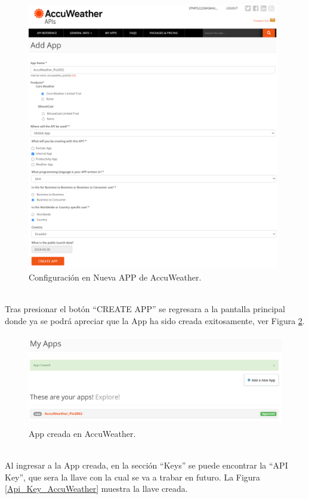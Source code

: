 \documentclass[a4paper,10pt, oneside, titlepage]{article}
\begin{document}
	\begin{figure}[!h]
		\centering
		\includegraphics[width = 1\linewidth, height = 11.7cm]{Configuracion_Nueva_APP_AccuWeather.png}
		\caption{Configuración  en Nueva APP de AccuWeather.}
		\label{Configuracion_Nueva_APP_AccuWeather}
	\end{figure} \\
	\indent Tras presionar el botón ``CREATE APP'' se regresara a la pantalla principal donde ya se podrá apreciar que la App ha sido creada exitosamente, ver Figura \ref{Nueva_APP_AccuWeather_Exito}.
	\begin{figure}[!h]
		\centering
		\includegraphics[width = 1\linewidth, height = 4cm]{Nueva_APP_AccuWeather_Exito.png}
		\caption{App creada en AccuWeather.}
		\label{Nueva_APP_AccuWeather_Exito}
	\end{figure} \\
	\indent Al ingresar a la App creada, en la sección ``Keys'' se puede encontrar la ``API Key'', que sera la llave con la cual se va a trabar en futuro. La Figura \ref{Api_Key_AccuWeather} muestra la llave creada.
\end{document}
